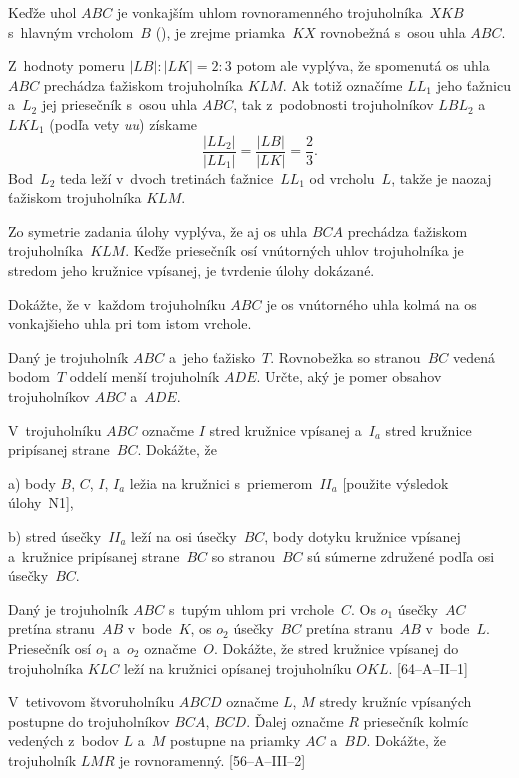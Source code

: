 {%
Keďže uhol $ABC$ je vonkajším uhlom rovnoramenného trojuholníka~$XKB$
s~hlavným vrcholom~$B$ (\obr), je zrejme
priamka~$KX$ rovnobežná s~osou uhla $ABC$.
%

Z~hodnoty pomeru $|LB|:|LK| = 2:3$ potom ale vyplýva, že spomenutá os uhla
$ABC$ prechádza ťažiskom trojuholníka $KLM$. Ak totiž označíme $LL_1$
jeho ťažnicu a~$L_2$ jej priesečník s~osou uhla $ABC$,
tak z~podobnosti trojuholníkov $LBL_2$ a~$LKL_1$
(podľa vety {\it uu}) získame
$$
\frac{|LL_2|}{|LL_1|} = \frac{|LB|}{|LK|} = \frac23.
$$
Bod~$L_2$ teda leží v~dvoch tretinách ťažnice~$LL_1$ od vrcholu~$L$, takže je
naozaj ťažiskom trojuholníka $KLM$.

Zo symetrie zadania úlohy vyplýva, že aj os uhla $BCA$ prechádza ťažiskom
trojuholníka~$KLM$. Keďže priesečník osí vnútorných uhlov trojuholníka
je stredom jeho kružnice vpísanej, je tvrdenie úlohy dokázané.



Dokážte, že v~každom trojuholníku $ABC$ je os vnútorného uhla
kolmá na os vonkajšieho uhla pri tom istom vrchole.

Daný je trojuholník $ABC$ a~jeho ťažisko~$T$. Rovnobežka so stranou~$BC$
vedená bodom~$T$ oddelí menší trojuholník $ADE$. Určte, aký je
pomer obsahov trojuholníkov $ABC$ a~$ADE$.

\D
V~trojuholníku $ABC$ označme $I$ stred kružnice vpísanej a~$I_a$
stred kružnice pripísanej strane~$BC$. Dokážte, že
\item{a)} body $B$, $C$, $I$, $I_a$ ležia na kružnici s~priemerom~$II_a$
[použite výsledok úlohy~N1],
\item{b)} stred úsečky~$II_a$ leží na osi úsečky~$BC$,
 body dotyku kružnice vpísanej a~kružnice pripísanej strane~$BC$ so stranou~$BC$
sú súmerne združené podľa osi úsečky~$BC$.

Daný je trojuholník $ABC$ s~tupým uhlom pri vrchole~$C$. Os $o_1$
úsečky~$AC$ pretína stranu~$AB$ v~bode~$K$, os $o_2$ úsečky~$BC$ pretína
stranu~$AB$ v~bode~$L$. Priesečník osí $o_1$ a~$o_2$ označme~$O$. Dokážte,
že stred kružnice vpísanej do trojuholníka $KLC$ leží na kružnici opísanej
trojuholníku $OKL$.
[64--A--II--1]

V~tetivovom štvoruholníku $ABCD$ označme $L$, $M$ stredy kružníc
vpísaných postupne do trojuholníkov $BCA$, $BCD$. Ďalej označme $R$
priesečník kolmíc vedených z~bodov $L$ a~$M$ postupne na priamky $AC$
a~$BD$. Dokážte, že trojuholník $LMR$ je rovnoramenný.
[56--A--III--2]
}

